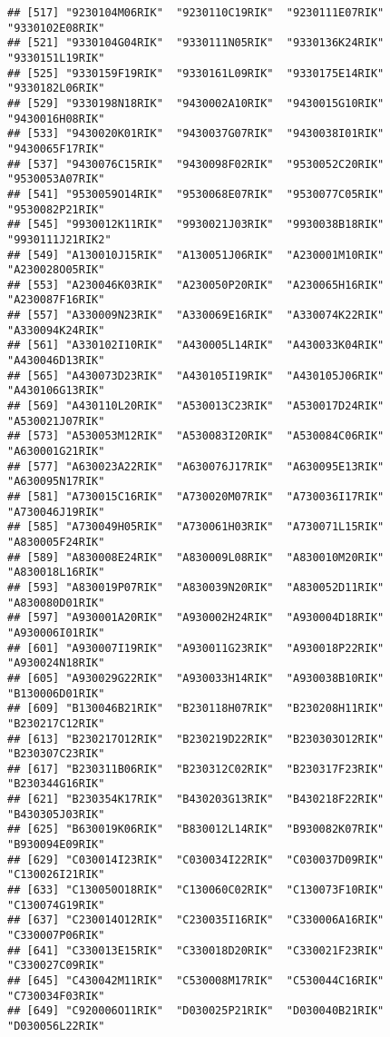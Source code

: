 \documentclass[
]{article}
\begin{document}
\begin{verbatim}
## [517] "9230104M06RIK"  "9230110C19RIK"  "9230111E07RIK"  "9330102E08RIK" 
## [521] "9330104G04RIK"  "9330111N05RIK"  "9330136K24RIK"  "9330151L19RIK" 
## [525] "9330159F19RIK"  "9330161L09RIK"  "9330175E14RIK"  "9330182L06RIK" 
## [529] "9330198N18RIK"  "9430002A10RIK"  "9430015G10RIK"  "9430016H08RIK" 
## [533] "9430020K01RIK"  "9430037G07RIK"  "9430038I01RIK"  "9430065F17RIK" 
## [537] "9430076C15RIK"  "9430098F02RIK"  "9530052C20RIK"  "9530053A07RIK" 
## [541] "9530059O14RIK"  "9530068E07RIK"  "9530077C05RIK"  "9530082P21RIK" 
## [545] "9930012K11RIK"  "9930021J03RIK"  "9930038B18RIK"  "9930111J21RIK2"
## [549] "A130010J15RIK"  "A130051J06RIK"  "A230001M10RIK"  "A230028O05RIK" 
## [553] "A230046K03RIK"  "A230050P20RIK"  "A230065H16RIK"  "A230087F16RIK" 
## [557] "A330009N23RIK"  "A330069E16RIK"  "A330074K22RIK"  "A330094K24RIK" 
## [561] "A330102I10RIK"  "A430005L14RIK"  "A430033K04RIK"  "A430046D13RIK" 
## [565] "A430073D23RIK"  "A430105I19RIK"  "A430105J06RIK"  "A430106G13RIK" 
## [569] "A430110L20RIK"  "A530013C23RIK"  "A530017D24RIK"  "A530021J07RIK" 
## [573] "A530053M12RIK"  "A530083I20RIK"  "A530084C06RIK"  "A630001G21RIK" 
## [577] "A630023A22RIK"  "A630076J17RIK"  "A630095E13RIK"  "A630095N17RIK" 
## [581] "A730015C16RIK"  "A730020M07RIK"  "A730036I17RIK"  "A730046J19RIK" 
## [585] "A730049H05RIK"  "A730061H03RIK"  "A730071L15RIK"  "A830005F24RIK" 
## [589] "A830008E24RIK"  "A830009L08RIK"  "A830010M20RIK"  "A830018L16RIK" 
## [593] "A830019P07RIK"  "A830039N20RIK"  "A830052D11RIK"  "A830080D01RIK" 
## [597] "A930001A20RIK"  "A930002H24RIK"  "A930004D18RIK"  "A930006I01RIK" 
## [601] "A930007I19RIK"  "A930011G23RIK"  "A930018P22RIK"  "A930024N18RIK" 
## [605] "A930029G22RIK"  "A930033H14RIK"  "A930038B10RIK"  "B130006D01RIK" 
## [609] "B130046B21RIK"  "B230118H07RIK"  "B230208H11RIK"  "B230217C12RIK" 
## [613] "B230217O12RIK"  "B230219D22RIK"  "B230303O12RIK"  "B230307C23RIK" 
## [617] "B230311B06RIK"  "B230312C02RIK"  "B230317F23RIK"  "B230344G16RIK" 
## [621] "B230354K17RIK"  "B430203G13RIK"  "B430218F22RIK"  "B430305J03RIK" 
## [625] "B630019K06RIK"  "B830012L14RIK"  "B930082K07RIK"  "B930094E09RIK" 
## [629] "C030014I23RIK"  "C030034I22RIK"  "C030037D09RIK"  "C130026I21RIK" 
## [633] "C130050O18RIK"  "C130060C02RIK"  "C130073F10RIK"  "C130074G19RIK" 
## [637] "C230014O12RIK"  "C230035I16RIK"  "C330006A16RIK"  "C330007P06RIK" 
## [641] "C330013E15RIK"  "C330018D20RIK"  "C330021F23RIK"  "C330027C09RIK" 
## [645] "C430042M11RIK"  "C530008M17RIK"  "C530044C16RIK"  "C730034F03RIK" 
## [649] "C920006O11RIK"  "D030025P21RIK"  "D030040B21RIK"  "D030056L22RIK" 

\end{verbatim}
\end{document}
